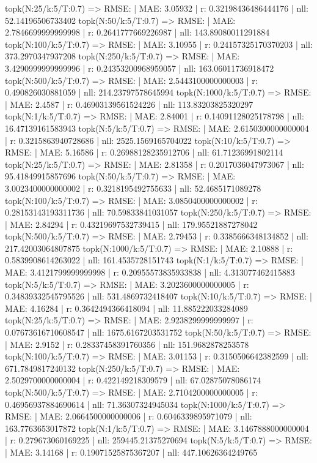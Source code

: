 topk(N:25/k:5/T:0.7) => RMSE: | MAE: 3.05932 | r: 0.32198436486444176 | nll: 52.14196506733402
topk(N:50/k:5/T:0.7) => RMSE: | MAE: 2.7846699999999998 | r: 0.2641777669226987 | nll: 143.89080011291884
topk(N:100/k:5/T:0.7) => RMSE: | MAE: 3.10955 | r: 0.24157325170370203 | nll: 373.2970347937208
topk(N:250/k:5/T:0.7) => RMSE: | MAE: 3.4290999999999996 | r: 0.24353200968959057 | nll: 163.06011736918472
topk(N:500/k:5/T:0.7) => RMSE: | MAE: 2.5443100000000003 | r: 0.490826030881059 | nll: 214.23797578645994
topk(N:1000/k:5/T:0.7) => RMSE: | MAE: 2.4587 | r: 0.46903139561524226 | nll: 113.83203825320297
topk(N:1/k:5/T:0.7) => RMSE: | MAE: 2.84001 | r: 0.14091128025178798 | nll: 16.47139161583943
topk(N:5/k:5/T:0.7) => RMSE: | MAE: 2.6150300000000004 | r: 0.3215863940728686 | nll: 2525.1569165704022
topk(N:10/k:5/T:0.7) => RMSE: | MAE: 5.16586 | r: 0.26988128235912706 | nll: 61.71236991802114
topk(N:25/k:5/T:0.7) => RMSE: | MAE: 2.81358 | r: 0.2017036047973067 | nll: 95.41849915857696
topk(N:50/k:5/T:0.7) => RMSE: | MAE: 3.0023400000000002 | r: 0.3218195492755633 | nll: 52.4685171089278
topk(N:100/k:5/T:0.7) => RMSE: | MAE: 3.0850400000000002 | r: 0.28153143193311736 | nll: 70.59833841031057
topk(N:250/k:5/T:0.7) => RMSE: | MAE: 2.84294 | r: 0.43219697532739415 | nll: 179.95521887278042
topk(N:500/k:5/T:0.7) => RMSE: | MAE: 2.79453 | r: 0.3385666348134852 | nll: 217.42003064807875
topk(N:1000/k:5/T:0.7) => RMSE: | MAE: 2.10888 | r: 0.5839908614263022 | nll: 161.4535728151743
topk(N:1/k:5/T:0.7) => RMSE: | MAE: 3.4121799999999998 | r: 0.20955573835933838 | nll: 4.313077462415883
topk(N:5/k:5/T:0.7) => RMSE: | MAE: 3.2023600000000005 | r: 0.34839332545795526 | nll: 531.4869732418407
topk(N:10/k:5/T:0.7) => RMSE: | MAE: 4.16284 | r: 0.3642494366418094 | nll: 11.885222033284089
topk(N:25/k:5/T:0.7) => RMSE: | MAE: 2.9238299999999997 | r: 0.07673616710608547 | nll: 1675.6167203531752
topk(N:50/k:5/T:0.7) => RMSE: | MAE: 2.9152 | r: 0.28337458391760356 | nll: 151.9682878253578
topk(N:100/k:5/T:0.7) => RMSE: | MAE: 3.01153 | r: 0.3150506642382599 | nll: 671.7849817240132
topk(N:250/k:5/T:0.7) => RMSE: | MAE: 2.5029700000000004 | r: 0.422149218309579 | nll: 67.02875078086174
topk(N:500/k:5/T:0.7) => RMSE: | MAE: 2.7104200000000005 | r: 0.46956937884690614 | nll: 71.36307324945034
topk(N:1000/k:5/T:0.7) => RMSE: | MAE: 2.0664500000000006 | r: 0.6046339895971079 | nll: 163.7763653017872
topk(N:1/k:5/T:0.7) => RMSE: | MAE: 3.1467888000000004 | r: 0.279673060169225 | nll: 259445.21375270694
topk(N:5/k:5/T:0.7) => RMSE: | MAE: 3.14168 | r: 0.19071525875367207 | nll: 447.10626364249765
